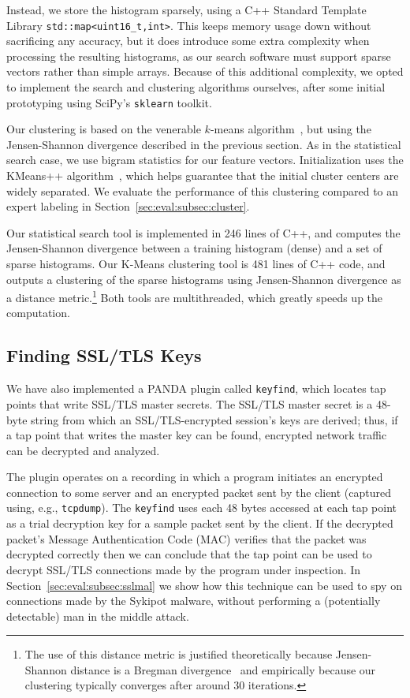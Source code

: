 Instead, we store the histogram sparsely, using a C++ Standard Template
Library \texttt{std::map<uint16\_t,int>}. This keeps memory usage down
without sacrificing any accuracy, but it does introduce some extra
complexity when processing the resulting histograms, as our search
software must support sparse vectors rather than simple arrays. Because
of this additional complexity, we opted to implement the search and
clustering algorithms ourselves, after some initial prototyping using
SciPy's \texttt{sklearn} toolkit.

Our clustering is based on the venerable $k$-means
algorithm~\cite{Steinhaus:1956kx}, but using the Jensen-Shannon
divergence described in the previous section. As in the statistical
search case, we use bigram statistics for our feature vectors.
Initialization uses the KMeans++ algorithm~\cite{Arthur:2007ve}, which
helps guarantee that the initial cluster centers are widely separated.
We evaluate the performance of this clustering compared to an expert
labeling in Section~\ref{sec:eval:subsec:cluster}.

Our statistical search tool is implemented in 246 lines of C++, and
computes the Jensen-Shannon divergence between a training histogram
(dense) and a set of sparse histograms. Our K-Means clustering tool is
481 lines of C++ code, and outputs a clustering of the sparse histograms
using Jensen-Shannon divergence as a distance metric.\footnote{The use
of this distance metric is justified theoretically because
Jensen-Shannon distance is a Bregman divergence~\cite{Banerjee:2005qf}
and empirically because our clustering typically converges after around
30 iterations.} Both tools are multithreaded, which greatly speeds up the
computation.

\subsection{Finding SSL/TLS Keys}
\label{sec:implementation:subsec:keyfind}

We have also implemented a PANDA plugin called \texttt{keyfind}, which
locates tap points that write SSL/TLS master secrets. The SSL/TLS master
secret is a 48-byte string from which an SSL/TLS-encrypted session's
keys are derived; thus, if a tap point that writes the master key can be
found, encrypted network traffic can be decrypted and analyzed.

The plugin operates on a recording in which a program initiates an
encrypted connection to some server and an encrypted packet sent by the
client (captured using, e.g., \texttt{tcpdump}). The \texttt{keyfind}
uses each 48 bytes accessed at each tap point as a trial decryption key
for a sample packet sent by the client. If the decrypted packet's
Message Authentication Code (MAC) verifies that the packet was decrypted
correctly then we can conclude that the tap point can be used to decrypt
SSL/TLS connections made by the program under inspection. In
Section~\ref{sec:eval:subsec:sslmal} we show how this technique can be
used to spy on connections made by the Sykipot malware, without
performing a (potentially detectable) man in the middle attack.
